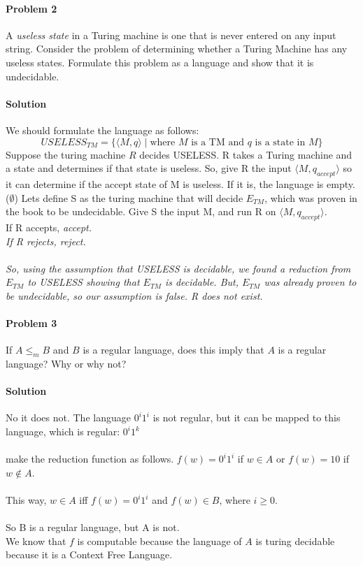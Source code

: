 \documentclass{article}
\begin{document}
\paragraph{Problem 2} A {\em useless state} in a Turing machine
is one that is never entered on any input string.  Consider the 
problem of determining whether a Turing Machine has any useless 
states.  Formulate this problem as a language and show that it 
is undecidable.

\paragraph{Solution} We should formulate the language as follows:
\[USELESS_{TM} = \{ \langle M,q \rangle \;|\; \mbox{where $M$ is a TM and $q$ is a state in $M$} \}\]
\noindent Suppose the turing machine $R$ decides USELESS. R takes a Turing machine and a state and determines if that state is useless. So, give R the input $\langle M, q_{accept}\rangle$ so it can determine if the accept state of M is useless. If it is, the language is empty. ($\emptyset$) Lets define S as the turing machine that will decide $E_{TM}$, which was proven in the book to be undecidable. Give S the input M, and run R on $\langle M, q_{accept}\rangle$.
\\If R accepts, \em accept.\em
\\If R rejects, \em reject. \em
\\\\So, using the assumption that USELESS is decidable, we found a reduction from $E_{TM}$ to USELESS showing that $E_{TM}$ is decidable. But, $E_{TM}$ was already proven to be undecidable, so our assumption is false. R does not exist.

\paragraph{Problem 3} If $A \leq_m B$ and $B$ is a regular language,
does this imply that $A$ is a regular language? Why or why not?
\paragraph{Solution} No it does not. The language $0^i1^i$ is not regular, but it can be mapped to this language, which is regular: $0^i1^k$
\\\\make the reduction function as follows. $f(w) = 0^i1^i$ if $w \in A$ or $f(w) = 10$ if $w \notin A$.
\\\\This way, $w \in A$ iff $f(w) = 0^i1^i$ and $f(w) \in B$, where $i \geq 0$.
\\\\So B is a regular language, but A is not.
\\We know that $f$ is computable because the language of $A$ is turing decidable because it is a Context Free Language.
\end{document}
